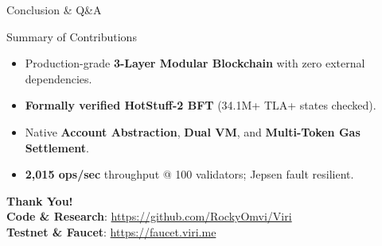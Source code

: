 \documentclass[10pt]{beamer}
\begin{document}
\begin{frame}{Conclusion \& Q\&A}
  \begin{block}{Summary of Contributions}
    \begin{itemize}
      \item Production-grade \textbf{3-Layer Modular Blockchain} with zero external dependencies.
      \item \textbf{Formally verified HotStuff-2 BFT} (34.1M+ TLA+ states checked).
      \item Native \textbf{Account Abstraction}, \textbf{Dual VM}, and \textbf{Multi-Token Gas Settlement}.
      \item \textbf{2,015 ops/sec} throughput @ 100 validators; Jepsen fault resilient.
    \end{itemize}
  \end{block}

  \vspace{0.5cm}
  \centering
  \Large \textbf{Thank You!} \\
  \vspace{0.2cm}
  \small \textbf{Code \& Research}: \url{https://github.com/RockyOmvi/Viri} \\
  \small \textbf{Testnet & Faucet}: \url{https://faucet.viri.me}
\end{frame}
\end{document}
